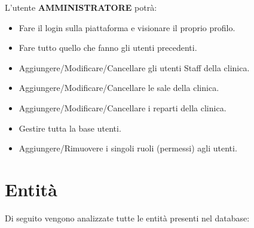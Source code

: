 \documentclass[paper=a4, fontsize=11pt,x11names]{report}
\begin{document}
L'utente \textbf{AMMINISTRATORE} potrà:
\begin{itemize}
\item Fare il login sulla piattaforma e visionare il proprio profilo.
\item Fare tutto quello che fanno gli utenti precedenti.
\item Aggiungere/Modificare/Cancellare gli utenti Staff della clinica.
\item Aggiungere/Modificare/Cancellare le sale della clinica.
\item Aggiungere/Modificare/Cancellare i reparti della clinica.
\item Gestire tutta la base utenti.
\item Aggiungere/Rimuovere i singoli ruoli (permessi) agli utenti.
\end{itemize}

\section{Entità}
Di seguito vengono analizzate tutte le entità presenti nel database:


\end{document}
